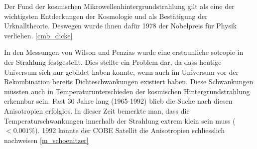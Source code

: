 Der Fund der kosmischen Mikrowellenhintergrundstrahlung gilt als eine der wichtigsten Entdeckungen der Kosmologie und als 
Bestätigung der Urknalltheorie.
Deswegen wurde ihnen dafür 1978 der Nobelpreis für Physik verliehen.
\ref{cmb_dicke}

In den Messungen von Wilson und Penzias wurde eine erstaunliche sotropie in der 
Strahlung festgestellt.
Dies stellte ein Problem dar, da dass heutige Universum sich nur gebildet haben 
konnte, wenn auch im Universum vor der Rekombination bereits Dichteschwankungen 
existiert haben.
Diese Schwankungen müssten auch in Temperaturunterschieden der kosmischen 
Hintergrundstrahlung erkennbar sein.
Fast 30 Jahre lang (1965-1992) blieb die Suche nach diesen Anisotropien 
erfolglos.
In dieser Zeit bemerkte man, dass die Temperaturschwankungen innerhalb der 
Strahlung extrem klein sein muss ($< 0.001\%$).
1992 konnte der \ac{COBE} Satellit die Anisotropien schliesslich nachweisen
\ref{m_schoenitzer}

